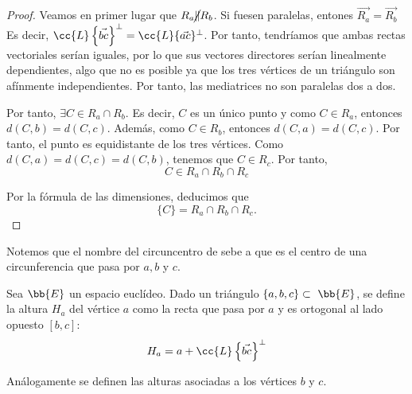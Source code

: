 \begin{proof}
    Veamos en primer lugar que $R_a \cancel{\|} R_b$. Si fuesen paralelas, entones $\vec{R_a}=\vec{R_b}$ Es decir, ${\cc{L}\left\{\vec{bc}\right\}^\perp} = {\cc{L}\{\vec{ac}\}^\perp}$. Por tanto, tendríamos que ambas rectas vectoriales serían iguales, por lo que sus vectores directores serían linealmente dependientes, algo que no es posible ya que los tres vértices de un triángulo son afínmente independientes. Por tanto, las mediatrices no son paralelas dos a dos.

    Por tanto, $\exists C\in R_a\cap R_b$. Es decir, $C$ es un único punto y como $C\in R_a$, entonces $d(C,b)=d(C,c)$. Además, como $C\in R_b$, entonces $d(C,a)=d(C,c)$. Por tanto, el punto es equidistante de los tres vértices. Como $d(C,a)=d(C,c)=d(C,b)$, tenemos que $C\in R_c$. Por tanto,
    \begin{equation*}
        C\in R_a\cap R_b\cap R_c
    \end{equation*}

    Por la fórmula de las dimensiones, deducimos que $$\{C\}=R_a\cap R_b\cap R_c.$$
\end{proof}
Notemos que el nombre del circuncentro de sebe a que es el centro de una circunferencia que pasa por $a,b$ y $c$.


\begin{definicion}[Altura]
    Sea $\bb{E}$ un espacio euclídeo. Dado un triángulo $\{a,b,c\}\subset~\bb{E}$, se define la altura $H_a$ del vértice $a$ como la recta que pasa por $a$ y es ortogonal al lado opuesto $[b,c]$:
    \begin{equation*}
        H_a = a + \cc{L}\left\{\vec{bc}\right\}^\perp
    \end{equation*}

    Análogamente se definen las alturas asociadas a los vértices $b$ y $c$.
\end{definicion}

